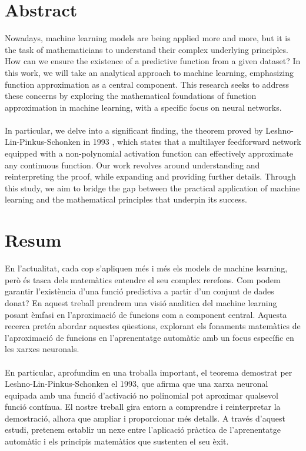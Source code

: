 \documentclass[../../main.tex]{subfiles}
\begin{document}
\section*{Abstract} %


\noindent Nowadays, machine learning models are being applied more and more, but it is the task of mathematicians to understand their complex underlying principles. How can we ensure the existence of a predictive function from a given dataset? In this work, we will take an analytical approach to machine learning, emphasizing function approximation as a central component. This research seeks to address these concerns by exploring the mathematical foundations of function approximation in machine learning, with a specific focus on neural networks.
\\ \\
In particular, we delve into a significant finding, the theorem proved by Leshno-Lin-Pinkus-Schonken in 1993 \cite{leshno1993multilayer}, which states that a multilayer feedforward network equipped with a non-polynomial activation function can effectively approximate any continuous function. Our work revolves around understanding and reinterpreting the proof, while expanding and providing further details.
Through this study, we aim to bridge the gap between the practical application of machine learning and the mathematical principles that underpin its success.

\newpage

\section*{Resum}
\noindent En l'actualitat, cada cop s'apliquen més i més els models de machine learning, però és tasca dels matemàtics entendre el seu complex rerefons. Com podem garantir l'existència d'una funció predictiva a partir d'un conjunt de dades donat?  En aquest treball prendrem una visió analitica del machine learning posant èmfasi en l'aproximació de funcions com a component central. Aquesta recerca pretén abordar aquestes qüestions, explorant els fonaments matemàtics de l'aproximació de funcions en l'aprenentatge automàtic amb un focus específic en les xarxes neuronals.
\\ \\
\noindent En particular, aprofundim en una troballa important, el teorema demostrat per Leshno-Lin-Pinkus-Schonken el 1993, que afirma que una xarxa neuronal equipada amb una funció d'activació no polinomial pot aproximar qualsevol funció contínua. El nostre treball gira entorn a comprendre i reinterpretar la demostració, alhora que ampliar i proporcionar més detalls.
A través d'aquest estudi, pretenem establir un nexe entre l'aplicació pràctica de l'aprenentatge automàtic i els principis matemàtics que sustenten el seu èxit.
\newpage
\end{document}
